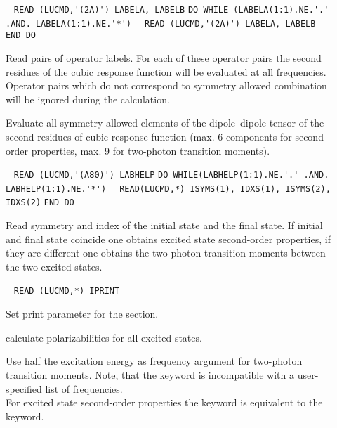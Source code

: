\begin{description}
\item[] \verb| |\newline
\verb|READ (LUCMD,'(2A)') LABELA, LABELB|\newline
\verb|DO WHILE (LABELA(1:1).NE.'.' .AND. LABELA(1:1).NE.'*')|\newline
\verb|  READ (LUCMD,'(2A)') LABELA, LABELB|\newline
\verb|END DO|

Read pairs of operator labels.
For each of these operator pairs the second residues of the cubic response
function will be evaluated at all frequencies.
Operator pairs which do not correspond to symmetry allowed
combination will be ignored during the calculation.
 
\item[] 
Evaluate all symmetry allowed elements of the dipole--dipole tensor
of the second residues of cubic response function 
(max. 6 components for second-order properties, 
 max. 9 for two-photon transition moments).
 
\item[] \verb| |\newline
\verb|READ (LUCMD,'(A80)') LABHELP|\newline
\verb|DO WHILE(LABHELP(1:1).NE.'.' .AND. LABHELP(1:1).NE.'*')|\newline
\verb|  READ(LUCMD,*) ISYMS(1), IDXS(1), ISYMS(2), IDXS(2)|\newline
\verb|END DO|

Read symmetry and index of the initial state and the final state.
If initial and final state coincide one obtains excited state
second-order properties, if they are different one obtains the
two-photon transition moments between the two excited states.
 
\item[] \verb| |\newline
\verb|READ (LUCMD,*) IPRINT|

Set print parameter for the  section.
 
\item[] 
calculate polarizabilities for all excited states.
 
\item[] 
Use half the excitation energy as frequency argument for two-photon
transition moments.
Note, that the  keyword is incompatible with a 
user-specified list of frequencies. \\
For excited state second-order properties the  keyword is
equivalent to the  keyword.
 

\end{description}
